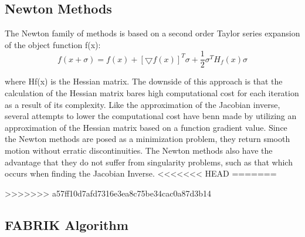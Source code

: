 \subsection{Newton Methods}
The Newton family of methods is based on a second order Taylor series expansion of the object function f(x):
\begin{equation}
f(x+\sigma)= f(x)+ [\bigtriangledown f(x)]^{T}\sigma + \frac{1}{2}\sigma^{T}H_{f}(x)\sigma
\end{equation}

where Hf(x) is the Hessian matrix. The downside of this approach is that the calculation of the Hessian matrix bares high computational cost for each iteration as a result of its complexity. Like the approximation of the Jacobian inverse, several attempts to lower the computational cost have benn made by utilizing an approximation of the Hessian matrix based on a function gradient value.
Since the Newton methods are posed as a minimization problem, they return smooth motion without erratic discontinuities.
The Newton methods also have the advantage that they do not suffer from singularity problems, such as that which occurs when finding the Jacobian Inverse.
<<<<<<< HEAD
\newpage
=======

>>>>>>> a57ff10d7afd7316e3ea8c75be34cac0a87d3b14
\subsection{FABRIK Algorithm}

